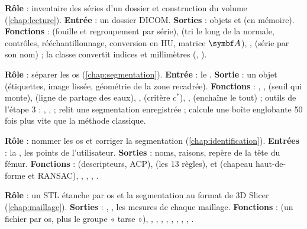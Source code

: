 \textbf{Rôle} : inventaire des séries d'un dossier et construction du volume (\cref{chap:lecture}).
\textbf{Entrée} : un dossier DICOM. \textbf{Sorties} : objets  et  (en mémoire).
\textbf{Fonctions} :  (fouille et regroupement par série),  (tri le long de la
normale, contrôles, rééchantillonnage, conversion en HU, matrice $\mt{A}$), ,
 (série par son nom) ; la classe  convertit indices et millimètres
(, ).

\textbf{Rôle} : séparer les os (\cref{chap:segmentation}). \textbf{Entrée} : le . \textbf{Sortie} :
un objet  (étiquettes, image lissée, géométrie de la zone recadrée).
\textbf{Fonctions} : , ,  (seuil qui monte),
 (ligne de partage des eaux), ,  (critère $c^*$),
,  (enchaîne le tout) ; outils de l'étape 3 : ,
,  ;  relit une segmentation enregistrée ;
 calcule une boîte englobante 50 fois plus vite que la méthode classique.

\textbf{Rôle} : nommer les os et corriger la segmentation (\cref{chap:identification}). \textbf{Entrées} : la
, les points de l'utilisateur. \textbf{Sorties} : noms, raisons, repère de la tête du fémur.
\textbf{Fonctions} :  (descripteurs, ACP),  (les 13 règles), 
et  (chapeau haut-de-forme et RANSAC), , ,
, .

\textbf{Rôle} : un STL étanche par os et la segmentation au format de 3D Slicer (\cref{chap:maillage}).
\textbf{Sorties} : , , les mesures de chaque maillage.
\textbf{Fonctions} :  (un fichier par os, plus le groupe « tarse »), ,
, , , , ,
, , .

